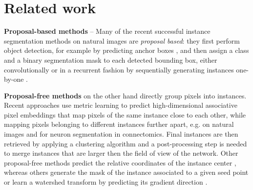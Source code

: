 
\section{Related work} \label{sec:related_work}
\textbf{Proposal-based methods} -- Many of the recent successful instance segmentation methods on natural images are \emph{proposal based}: they first perform object detection, for example by predicting anchor boxes \cite{ren2015faster}, and then assign a class and a binary segmentation mask to each detected bounding box, either convolutionally \cite{he2017mask,porzi2019seamless,liu2018path,yang2012layered,li2017fully,ladicky2010and,hariharan2014simultaneous,chen2015multi,dai2016instance,liang2016reversible} or in a recurrent fashion by sequentially generating instances one-by-one \cite{romera2016recurrent,ren2017end}. 

\textbf{Proposal-free methods} on the other hand directly group pixels into instances. 
Recent approaches use metric learning to predict high-dimensional associative pixel embeddings that map pixels of the same instance close to each other, while mapping pixels belonging to different instances further apart, e.g. \cite{kong2018recurrentPix,fathi2017semantic,newell2017associative,de2017semantic} on natural images and \cite{lee2019learning} for neuron segmentation in connectomics. %
Final instances are then retrieved by applying a clustering algorithm and a post-processing step is needed to merge instances that are larger then the field of view of the network. 
Other proposal-free methods predict the relative coordinates of the instance center \cite{neven2019instance,cheng2019panopticdeeplab}, whereas others generate the mask of the instance associated to a given seed point \cite{sofiiuk2019adaptis} or  
learn a watershed transform by predicting its gradient direction \cite{bai2017deep}. 

